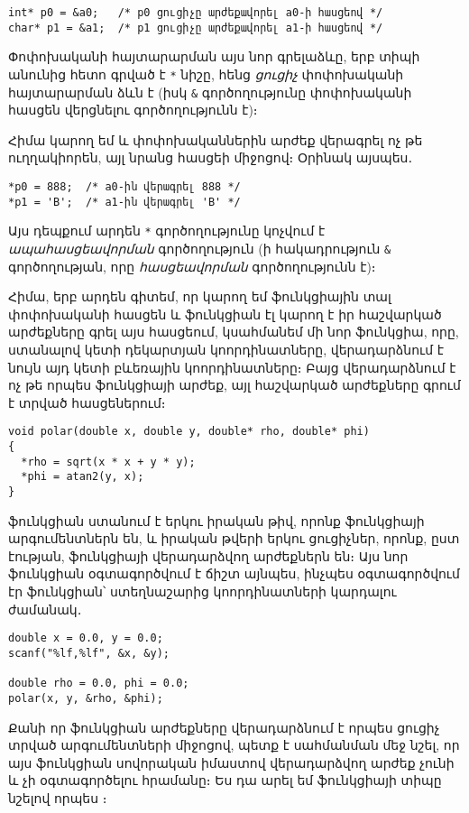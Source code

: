 \begin{Verbatim}
int* p0 = &a0;   /* p0 ցուցիչը արժեքավորել a0-ի հասցեով */
char* p1 = &a1;  /* p1 ցուցիչը արժեքավորել a1-ի հասցեով */
\end{Verbatim}

Փոփոխականի հայտարարման այս նոր գրելաձևը, երբ տիպի անունից հետո գրված
է \verb|*| նիշը, հենց \emph{ցուցիչ} փոփոխականի հայտարարման ձևն է (իսկ
\verb|&| գործողությունը փոփոխականի հասցեն վերցնելու գործողությունն է)։

Հիմա կարող եմ  և  փոփոխականներին արժեք վերագրել ոչ թե
ուղղակիորեն, այլ նրանց հասցեի միջոցով։ Օրինակ այսպես․

\begin{Verbatim}
*p0 = 888;  /* a0-ին վերագրել 888 */
*p1 = 'B';  /* a1-ին վերագրել 'B' */
\end{Verbatim}

Այս դեպքում արդեն \verb|*| գործողությունը կոչվում է \emph{ապահասցեավորման}
գործողություն (ի հակադրություն \verb|&| գործողության, որը \emph{հասցեավորման}
գործողությունն է)։

Հիմա, երբ արդեն գիտեմ, որ կարող եմ ֆունկցիային տալ փոփոխականի հասցեն և
ֆունկցիան էլ կարող է իր հաշվարկած արժեքները գրել այս հասցեում, կսահմանեմ
մի նոր ֆունկցիա, որը, ստանալով կետի դեկարտյան կոորդինատները, վերադարձնում
է նույն այդ կետի բևեռային կոորդինատները։ Բայց վերադարձնում է ոչ թե որպես
ֆունկցիայի արժեք, այլ հաշվարկած արժեքները գրում է տրված հասցեներում։

\begin{Verbatim}
void polar(double x, double y, double* rho, double* phi)
{
  *rho = sqrt(x * x + y * y);
  *phi = atan2(y, x);
}
\end{Verbatim}

 ֆունկցիան ստանում է երկու իրական թիվ, որոնք ֆունկցիայի
արգումենտներն են, և իրական թվերի երկու ցուցիչներ, որոնք, ըստ էության,
ֆունկցիայի վերադարձվող արժեքներն են։ Այս նոր ֆունկցիան օգտագործվում է
ճիշտ այնպես, ինչպես օգտագործվում էր  ֆունկցիան՝ ստեղնաշարից
կոորդինատների կարդալու ժամանակ․

\begin{Verbatim}
double x = 0.0, y = 0.0;
scanf("%lf,%lf", &x, &y);

double rho = 0.0, phi = 0.0;
polar(x, y, &rho, &phi);
\end{Verbatim}

Քանի որ  ֆունկցիան արժեքները վերադարձնում է որպես ցուցիչ
տրված արգումենտների միջոցով, պետք է սահմանման մեջ նշել, որ այս ֆունկցիան
սովորական իմաստով վերադարձվող արժեք չունի և չի օգտագործելու 
հրամանը։ Ես դա արել եմ ֆունկցիայի տիպը նշելով որպես ։


